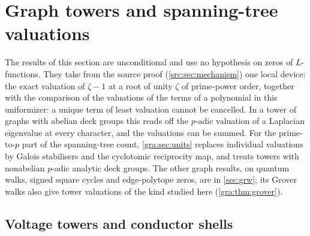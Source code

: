 \section{Graph towers and spanning-tree valuations}\label{sec:gra}

\providecommand{\grah}{\mathsf{h}}
\providecommand{\graA}{\mathcal{A}}
\providecommand{\graP}{\mathbb{P}}
\providecommand{\gramu}{\boldsymbol{\mu}}
\providecommand{\graPi}{\Pi}
\providecommand{\gracut}{\vartheta}
\providecommand{\graunit}{\operatorname{unit}_p}
\providecommand{\grafiles}[1]{\begin{center}\footnotesize#1\end{center}}
\providecommand{\graJac}{\operatorname{Jac}}
\providecommand{\grahat}[1]{\widehat{#1}}

The results of this section are unconditional and use no hypothesis on zeros
of $L$-functions. They take from the source proof (\cref{src:sec:mechanism})
one local device: the exact valuation of $\zeta-1$ at a
root of unity $\zeta$ of prime-power order, together with the comparison of
the valuations of the terms of a polynomial in this uniformizer: a unique
term of least valuation cannot be cancelled. In a tower of graphs with
abelian deck groups this reads off the $p$-adic valuation of a Laplacian
eigenvalue at every character, and the valuations can be summed. For the
prime-to-$p$ part of the spanning-tree count, \cref{gra:sec:units} replaces
individual valuations by Galois stabilisers and the cyclotomic reciprocity
map, and treats towers with nonabelian $p$-adic analytic deck groups. The
other graph results, on quantum walks, signed square cycles and edge-polytope
zeros, are in \cref{sec:grw}; its Grover walks also give tower valuations of
the kind studied here (\cref{gra:thm:grover}).

\subsection{Voltage towers and conductor shells}\label{gra:sec:setting}
{\raggedright
{}
}


